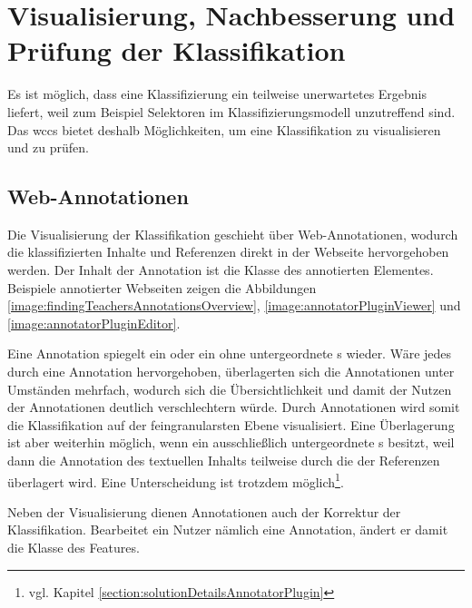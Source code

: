 \section{Visualisierung, Nachbesserung und Prüfung der Klassifikation}
    \label{section:conceptVisualization}
    Es ist möglich, dass eine Klassifizierung ein teilweise unerwartetes Ergebnis liefert,
    weil zum Beispiel Selektoren im Klassifizierungsmodell unzutreffend sind.
    Das \gls{wccs} bietet deshalb Möglichkeiten,
    um eine Klassifikation zu visualisieren und zu prüfen.

    \subsection{Web-Annotationen}
        \label{section:conceptWebAnnotations}
        Die Visualisierung der Klassifikation geschieht über Web-Annotationen,
        wodurch die klassifizierten Inhalte und Referenzen direkt in der Webseite hervorgehoben werden.
        Der Inhalt der Annotation ist die Klasse des annotierten Elementes.
        Beispiele annotierter Webseiten zeigen die Abbildungen
        \ref{image:findingTeachersAnnotationsOverview},
        \ref{image:annotatorPluginViewer} und \ref{image:annotatorPluginEditor}.

        Eine Annotation spiegelt ein {} oder ein
        {\contentFeature} ohne untergeordnete {\contentFeature}s wieder.
        Wäre jedes {\contentFeature} durch eine Annotation hervorgehoben,
        überlagerten sich die Annotationen unter Umständen mehrfach,
        wodurch sich die Übersichtlichkeit
        und damit der Nutzen der Annotationen deutlich verschlechtern würde.
        Durch Annotationen wird somit die Klassifikation auf der feingranularsten Ebene visualisiert.
        Eine Überlagerung ist aber weiterhin möglich,
        wenn ein {\contentFeature} ausschließlich untergeordnete {}s besitzt,
        weil dann die Annotation des textuellen Inhalts teilweise durch die
        der Referenzen überlagert wird.
        Eine Unterscheidung ist trotzdem möglich\footnote{vgl. Kapitel \ref{section:solutionDetailsAnnotatorPlugin}}.
        
        Neben der Visualisierung dienen Annotationen auch der Korrektur der Klassifikation.
        Bearbeitet ein Nutzer nämlich eine Annotation,
        ändert er damit die Klasse des Features.

